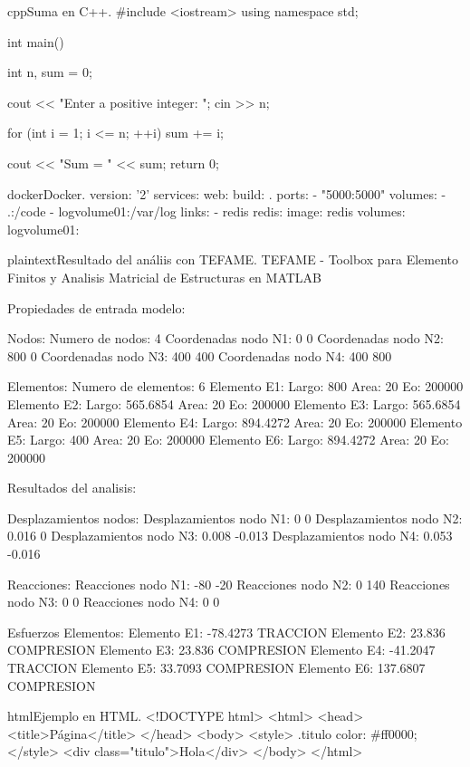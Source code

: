 \begin{sourcecode}{cpp}{Suma en C++.}
#include <iostream>
using namespace std;

int main()
{
	int n, sum = 0;
	
	cout << "Enter a positive integer: ";
	cin >> n;
	
	for (int i = 1; i <= n; ++i) {
		sum += i;
	}
	
	cout << "Sum = " << sum;
	return 0;
}
\end{sourcecode}

\begin{sourcecode}{docker}{Docker.}
version: '2'
services:
web:
build: .
ports:
- "5000:5000"
volumes:
- .:/code
- logvolume01:/var/log
links:
- redis
redis:
image: redis
volumes:
logvolume01: {}
\end{sourcecode}

\begin{sourcecode}{plaintext}{Resultado del análiis con TEFAME.}
TEFAME - Toolbox para Elemento Finitos y Analisis
Matricial de Estructuras en MATLAB

Propiedades de entrada modelo:

Nodos: 
Numero de nodos: 4 
Coordenadas nodo N1: 0 0
Coordenadas nodo N2: 800 0
Coordenadas nodo N3: 400 400
Coordenadas nodo N4: 400 800

Elementos: 
Numero de elementos: 6 
Elemento E1:	Largo: 800         Area: 20        Eo: 200000    
Elemento E2:	Largo: 565.6854    Area: 20        Eo: 200000    
Elemento E3:	Largo: 565.6854    Area: 20        Eo: 200000    
Elemento E4:	Largo: 894.4272    Area: 20        Eo: 200000    
Elemento E5:	Largo: 400         Area: 20        Eo: 200000    
Elemento E6:	Largo: 894.4272    Area: 20        Eo: 200000    

Resultados del analisis:

Desplazamientos nodos: 
Desplazamientos nodo N1: 0 0
Desplazamientos nodo N2: 0.016 0
Desplazamientos nodo N3: 0.008 -0.013
Desplazamientos nodo N4: 0.053 -0.016

Reacciones: 
Reacciones nodo N1: -80 -20
Reacciones nodo N2: 0 140
Reacciones nodo N3: 0 0
Reacciones nodo N4: 0 0

Esfuerzos Elementos: 
Elemento E1: -78.4273       TRACCION
Elemento E2: 23.836         COMPRESION
Elemento E3: 23.836         COMPRESION
Elemento E4: -41.2047       TRACCION
Elemento E5: 33.7093        COMPRESION
Elemento E6: 137.6807       COMPRESION
\end{sourcecode}

\begin{sourcecode}[\label{codigo-html}]{html}{Ejemplo en HTML.}
<!DOCTYPE html>
<html>
<head>
	<title>Página</title>
</head>
<body>
	<style>
		.titulo {
			color: #ff0000;
		}
	</style>
	<div class="titulo">Hola</div>
</body>
</html>
\end{sourcecode}

